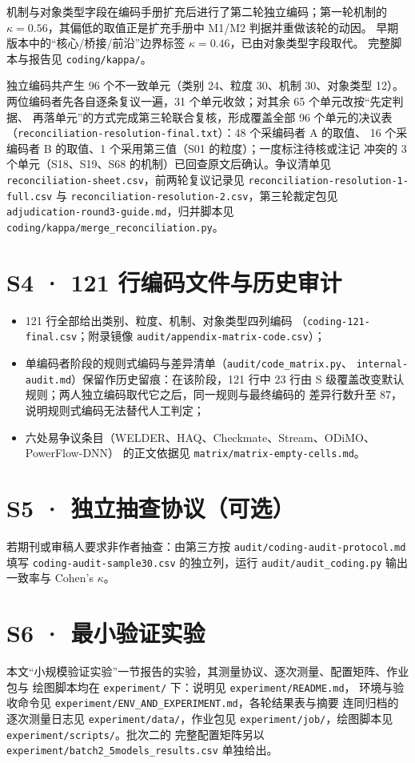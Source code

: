 \documentclass[11pt,a4paper]{article}
\begin{document}
机制与对象类型字段在编码手册扩充后进行了第二轮独立编码；第一轮机制的
$\kappa=0.56$，其偏低的取值正是扩充手册中 M1/M2 判据并重做该轮的动因。
早期版本中的“核心/桥接/前沿”边界标签 $\kappa=0.46$，已由对象类型字段取代。
完整脚本与报告见 \texttt{coding/kappa/}。

独立编码共产生 96 个不一致单元（类别 24、粒度 30、机制 30、对象类型 12）。
两位编码者先各自逐条复议一遍，31 个单元收敛；对其余 65 个单元改按“先定判据、
再落单元”的方式完成第三轮联合复核，形成覆盖全部 96 个单元的决议表
（\texttt{reconciliation-resolution-final.txt}）：48 个采编码者 A 的取值、
16 个采编码者 B 的取值、1 个采用第三值（S01 的粒度）；一度标注待核或注记
冲突的 3 个单元（S18、S19、S68 的机制）已回查原文后确认。争议清单见
\texttt{reconciliation-sheet.csv}，前两轮复议记录见
\texttt{reconciliation-resolution-1-full.csv} 与
\texttt{reconciliation-resolution-2.csv}，第三轮裁定包见
\texttt{adjudication-round3-guide.md}，归并脚本见
\texttt{coding/kappa/merge\_reconciliation.py}。

\section{S4 · 121 行编码文件与历史审计}
\begin{itemize}[leftmargin=2em,itemsep=1pt]
  \item 121 行全部给出类别、粒度、机制、对象类型四列编码
        （\texttt{coding-121-final.csv}；附录镜像
        \texttt{audit/appendix-matrix-code.csv}）；
  \item 单编码者阶段的规则式编码与差异清单（\texttt{audit/code\_matrix.py}、
        \texttt{internal-audit.md}）保留作历史留痕：在该阶段，121 行中 23 行由
        S 级覆盖改变默认规则；两人独立编码取代它之后，同一规则与最终编码的
        差异行数升至 87，说明规则式编码无法替代人工判定；
  \item 六处易争议条目（WELDER、HAQ、Checkmate、Stream、ODiMO、PowerFlow-DNN）
        的正文依据见 \texttt{matrix/matrix-empty-cells.md}。
\end{itemize}

\section{S5 · 独立抽查协议（可选）}
若期刊或审稿人要求非作者抽查：由第三方按
\texttt{audit/coding-audit-protocol.md} 填写 \texttt{coding-audit-sample30.csv}
的独立列，运行 \texttt{audit/audit\_coding.py} 输出一致率与 Cohen's $\kappa$。

\section{S6 · 最小验证实验}
本文“小规模验证实验”一节报告的实验，其测量协议、逐次测量、配置矩阵、作业包与
绘图脚本均在 \texttt{experiment/} 下：说明见 \texttt{experiment/README.md}，
环境与验收命令见 \texttt{experiment/ENV\_AND\_EXPERIMENT.md}，各轮结果表与摘要
连同归档的逐次测量日志见 \texttt{experiment/data/}，作业包见
\texttt{experiment/job/}，绘图脚本见 \texttt{experiment/scripts/}。批次二的
完整配置矩阵另以 \texttt{experiment/batch2\_5models\_results.csv} 单独给出。
\end{document}
